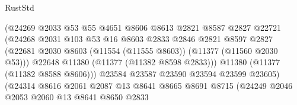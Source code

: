 \begin{lexlean}{RustStd}
\begin{coremodule}
                                      (@24269
                                        @2033
                                        @53
                                        @55
                                        @4651
                                        @8606
                                        @8613
                                        @2821
                                        @8587
                                        @2827
                                        @22721
                                        (@24268
                                          @2031
                                          @103
                                          @53
                                          @16
                                          @8603
                                          @2833
                                          @2846
                                          @2821
                                          @8597
                                          @2827
                                          (@22681
                                            @2030
                                            @8603
                                            (@11554 (@11555 @8603))
                                            (@11377 (@11560 @2030 @53)))
                                          @22648
                                          @11380
                                          (@11377 (@11382 @8598 @2833)))
                                        @11380
                                        (@11377 (@11382 @8588 @8606)))
                                      @23584
                                      @23587
                                      @23590
                                      @23594
                                      @23599
                                      @23605)
                                    (@24314
                                      @8616
                                      @2061
                                      @2087
                                      @13
                                      @8641
                                      @8665
                                      @8691
                                      @8715
                                      (@24249
                                        @2046
                                        @2053
                                        @2060
                                        @13
                                        @8641
                                        @8650
                                        @2833

\end{coremodule}
\end{lexlean}
